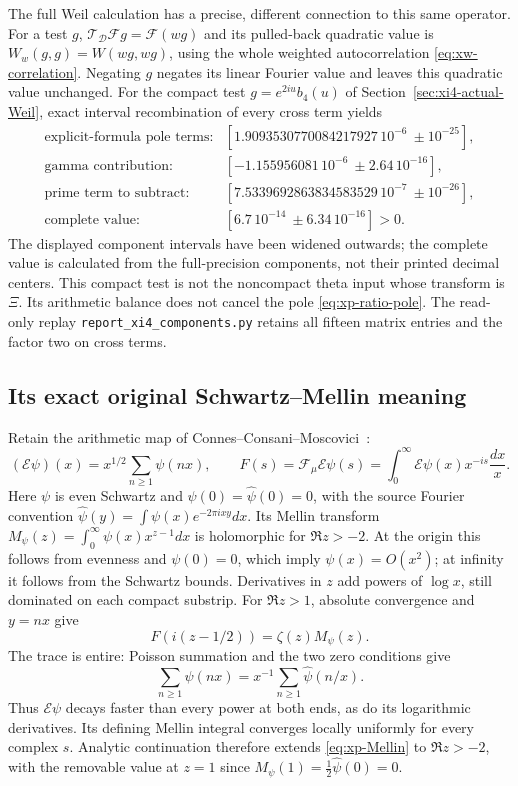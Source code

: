 The full Weil calculation has a precise, different connection to this
same operator. For a test $g$, $\mathcal T_{\mathcal D}\mathscr Fg
=\mathscr F(wg)$ and its pulled-back quadratic value is
$W_w(g,g)=W(wg,wg)$, using the whole weighted autocorrelation
\eqref{eq:xw-correlation}. Negating $g$ negates its linear Fourier
value and leaves this quadratic value unchanged. For the compact
test $g=e^{2iu}b_4(u)$ of Section~\ref{sec:xi4-actual-Weil}, exact
interval recombination of every cross term yields
\[
\begin{array}{rl}
 \text{explicit-formula pole terms:}&
 [1.9093530770084217927\,10^{-6}\ \pm 10^{-25}],\\
 \text{gamma contribution:}&[-1.155956081\,10^{-6}\ \pm2.64\,10^{-16}],\\
 \text{prime term to subtract:}&
 [7.5339692863834583529\,10^{-7}\ \pm 10^{-26}],\\
 \text{complete value:}&[6.7\,10^{-14}\ \pm6.34\,10^{-16}]>0.
\end{array}
\]
The displayed component intervals have been widened outwards; the
complete value is calculated from the full-precision components, not
their printed decimal centers. This compact test is not the
noncompact theta input whose transform is $\Xi$. Its arithmetic
balance does not cancel the pole \eqref{eq:xp-ratio-pole}.
The read-only replay \texttt{report\_xi4\_components.py} retains
all fifteen matrix entries and the factor two on cross terms.

\subsection{Its exact original Schwartz--Mellin meaning}

Retain the arithmetic map of
Connes--Consani--Moscovici~\cite[\S3.1 and \S3.6]{ccmProlate2024}:
\[
 (\mathcal E\psi)(x)=x^{1/2}\sum_{n\ge1}\psi(nx),\qquad
 F(s)=\mathcal F_\mu\mathcal E\psi(s)
     =\int_0^\infty\mathcal E\psi(x)x^{-is}\frac{dx}{x}.
\]
Here $\psi$ is even Schwartz and
$\psi(0)=\widehat\psi(0)=0$, with the source Fourier convention
$\widehat\psi(y)=\int\psi(x)e^{-2\pi ixy}dx$.
Its Mellin transform
$M_\psi(z)=\int_0^\infty\psi(x)x^{z-1}dx$
is holomorphic for $\Re z>-2$. At the origin this follows from
evenness and $\psi(0)=0$, which imply $\psi(x)=O(x^2)$; at infinity
it follows from the Schwartz bounds. Derivatives in $z$ add powers
of $\log x$, still dominated on each compact substrip.
For $\Re z>1$, absolute convergence and $y=nx$ give
\begin{equation}\label{eq:xp-Mellin}
 F(i(z-1/2))=\zeta(z)M_\psi(z).
\end{equation}
The trace is entire: Poisson summation and the two zero conditions
give
\[
 \sum_{n\ge1}\psi(nx)=x^{-1}\sum_{n\ge1}\widehat\psi(n/x).
\]
Thus $\mathcal E\psi$ decays faster than every power at both
ends, as do its logarithmic derivatives. Its defining Mellin
integral converges locally uniformly for every complex $s$.
Analytic continuation therefore extends \eqref{eq:xp-Mellin}
to $\Re z>-2$, with the removable value at $z=1$ since
$M_\psi(1)=\frac12\widehat\psi(0)=0$.


